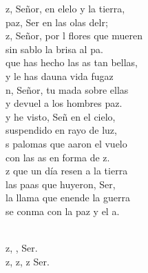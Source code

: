\documentclass[12pt]{article}
\begin{document}
\begin{multicols*}{2}
\begin{cancion}%
	z, Señor, en elelo y la tierra,\\
	paz, Ser en las olas delr;\\
	z, Señor, por l flores que mueren\\
	sin sablo la brisa al pa.\\
	 que has hecho las as tan bellas, \\
	y le has dauna vida fugaz\\
	n, Señor, tu mada sobre ellas\\
	y devuel a los hombres paz.\\
	y he visto, Señ en el cielo, \\
	suspendido en rayo de luz,\\
	s palomas que aaron el vuelo\\
	con las as en forma de z.\\
	z que un día resen a la tierra\\
	las paas que huyeron, Ser,\\
	la llama que enende la guerra\\
	se conma con la paz y el a.\\\jump\\
	\begin{chorus}%
	z, ,  Ser.\\
	z, z, z Ser.\\
	\end{chorus}%
	\jump\\
\end{cancion}%


\end{multicols*}
\end{document}

